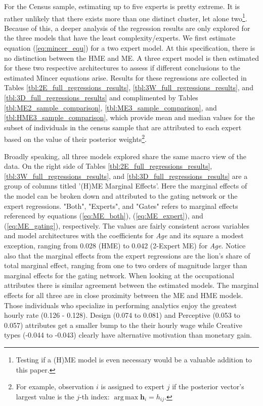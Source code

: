 \documentclass[12pt]{article}
\DeclareMathOperator*{\argmax}{arg\,max}
\begin{document}
\bigskip

For the Census sample, estimating up to five experts is pretty extreme.
It is rather unlikely that there exists more than one distinct cluster, let alone two\footnote{Testing if a (H)ME model is even necessary would be a valuable addition to this paper.}.
Because of this, a deeper analysis of the regression results are only explored
for the three models that have the least complexity/experts. We first estimate equation (\ref{eq:mincer_equ}) 
for a two expert model. At this specification, there is no distinction
between the HME and ME. A three expert model is then estimated for these two
respective architectures to assess if different conclusions to the estimated
Mincer equations arise. Results for these regressions are collected in Tables \ref{tbl:2E_full_regressions_results},
\ref{tbl:3W_full_regressions_results}, and \ref{tbl:3D_full_regressions_results}
and complimented by Tables \ref{tbl:ME2_sample_comparison}, \ref{tbl:ME3_sample_comparison},
and \ref{tbl:HME3_sample_comparison}, which provide mean and median values for the subset of individuals
in the census sample that are attributed to each expert based on the value of
their posterior weights\footnote{For example, observation $i$ is assigned to expert $j$ if the posterior vector's largest value is the $j$-th index: $\argmax \boldsymbol{h}_{i} = h_{ij}$.}.

\bigskip

Broadly speaking, all three models explored share the same macro view of the data.
On the right side of Tables \ref{tbl:2E_full_regressions_results},
\ref{tbl:3W_full_regressions_results}, and \ref{tbl:3D_full_regressions_results}
are a group of columns titled '(H)ME Marginal Effects'.
Here the marginal effects of the model can be broken down and attributed to the
gating network or the expert regressions. "Both", "Experts", and "Gates" refers to marginal effects referenced by equations
(\ref{eq:ME_both}), (\ref{eq:ME_expert}), and (\ref{eq:ME_gating}),
respectively. The values are fairly consistent across variables and model
architectures with the coefficients for \textit{Age} and its square a modest exception,
ranging from 0.028 (HME) to 0.042 (2-Expert ME) for \textit{Age}. Notice also that the
marginal effects from the expert regressions are the lion's share of total marginal effect,
ranging from one to two orders of magnitude larger than marginal effects for the gating
network. When looking at the occupational attributes there is similar agreement between
the estimated models. The marginal effects for all three are in close proximity between
the ME and HME models. Those individuals who specialize in performing analytics
enjoy the greatest hourly rate (0.126 - 0.128). Design (0.074 to 0.081) and 
Perceptive (0.053 to 0.057) attributes get a smaller bump to the their hourly
wage while Creative types (-0.044 to -0.043) clearly have alternative motivation than
monetary gain.
\end{document}
